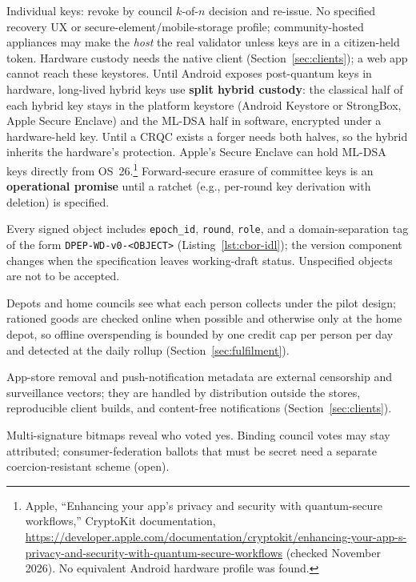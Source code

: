 \documentclass[10pt,twoside,openany]{book}
\theoremstyle{dpepstyle}
\begin{document}
\begin{description}[leftmargin=1.4em,itemsep=2pt]
  \item[Key compromise.] Individual keys: revoke by council $k$-of-$n$ decision and re-issue. No specified recovery UX or secure-element/mobile-storage profile; community-hosted appliances may make the \emph{host} the real validator unless keys are in a citizen-held token. Hardware custody needs the native client (Section~\ref{sec:clients}); a web app cannot reach these keystores. Until Android exposes post-quantum keys in hardware, long-lived hybrid keys use \textbf{split hybrid custody}: the classical half of each hybrid key stays in the platform keystore (Android Keystore or StrongBox, Apple Secure Enclave) and the ML-DSA half in software, encrypted under a hardware-held key. Until a CRQC exists a forger needs both halves, so the hybrid inherits the hardware's protection. Apple's Secure Enclave can hold ML-DSA keys directly from OS~26.\footnote{Apple, ``Enhancing your app's privacy and security with quantum-secure workflows,'' CryptoKit documentation, \url{https://developer.apple.com/documentation/cryptokit/enhancing-your-app-s-privacy-and-security-with-quantum-secure-workflows} (checked November 2026). No equivalent Android hardware profile was found.} Forward-secure erasure of committee keys is an \textbf{operational promise} until a ratchet (e.g., per-round key derivation with deletion) is specified.
  \item[Replay and domain separation.] Every signed object includes \texttt{epoch\_id}, \texttt{round}, \texttt{role}, and a domain-separation tag of the form \texttt{DPEP-WD-v0-<OBJECT>} (Listing~\ref{lst:cbor-idl}); the version component changes when the specification leaves working-draft status. Unspecified objects are not to be accepted.
  \item[Intra-year fulfillment.] Depots and home councils see what each person collects under the pilot design; rationed goods are checked online when possible and otherwise only at the home depot, so offline overspending is bounded by one credit cap per person per day and detected at the daily rollup (Section~\ref{sec:fulfilment}).
  \item[Distribution and notifications.] App-store removal and push-notification metadata are external censorship and surveillance vectors; they are handled by distribution outside the stores, reproducible client builds, and content-free notifications (Section~\ref{sec:clients}).
  \item[Secret ballot.] Multi-signature bitmaps reveal who voted yes. Binding council votes may stay attributed; consumer-federation ballots that must be secret need a separate coercion-resistant scheme (open).
\end{description}
\end{document}
